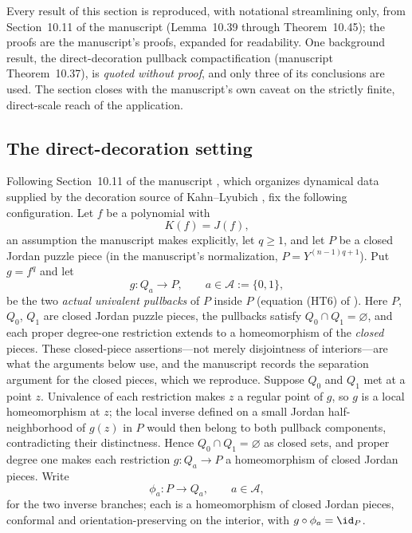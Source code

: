 Every result of this section is reproduced, with notational streamlining
only, from Section~10.11 of the manuscript \cite{MWman}
(Lemma~10.39 through Theorem~10.45); the proofs are the manuscript's
proofs, expanded for readability.  One background result, the
direct-decoration pullback compactification (manuscript Theorem~10.37), is
\emph{quoted without proof}, and only three of its conclusions are used.
The section closes with the manuscript's own caveat on the strictly
finite, direct-scale reach of the application.

\subsection{The direct-decoration setting}\label{subsec:F-setting}

Following Section~10.11 of the manuscript \cite{MWman}, which organizes
dynamical data supplied by the decoration source of Kahn--Lyubich
\cite{KL08}, fix the following configuration.  Let $f$ be a polynomial
with
\[
K(f)=J(f),
\]
an assumption the manuscript makes explicitly, let $q\ge1$, and let $P$ be
a closed Jordan puzzle piece (in the manuscript's normalization,
$P=Y^{(n-1)q+1}$).  Put $g=f^{q}$ and let
\begin{equation}\label{eq:F-pullbacks}
g\colon Q_a\longrightarrow P,\qquad a\in\mathcal A:=\{0,1\},
\end{equation}
be the two \emph{actual univalent pullbacks} of $P$ inside $P$ (equation
(HT6) of \cite{MWman}).  Here $P$, $Q_0$, $Q_1$ are closed Jordan puzzle
pieces, the pullbacks satisfy $Q_0\cap Q_1=\varnothing$, and each proper
degree-one restriction extends to a homeomorphism of the \emph{closed}
pieces.  These closed-piece assertions---not merely disjointness of
interiors---are what the arguments below use, and the manuscript records
the separation argument for the closed pieces, which we reproduce.
Suppose $Q_0$ and $Q_1$ met at a point $z$.  Univalence of each
restriction makes $z$ a regular point of $g$, so $g$ is a local
homeomorphism at $z$; the local inverse defined on a small Jordan
half-neighborhood of $g(z)$ in $P$ would then belong to both pullback
components, contradicting their distinctness.  Hence
$Q_0\cap Q_1=\varnothing$ as closed sets, and proper degree one makes each
restriction $g\colon Q_a\to P$ a homeomorphism of closed Jordan pieces.
Write
\[
\phi_a\colon P\longrightarrow Q_a,\qquad a\in\mathcal A,
\]
for the two inverse branches; each is a homeomorphism of closed Jordan
pieces, conformal and orientation-preserving on the interior, with
$g\circ\phi_a=\id_P$.

